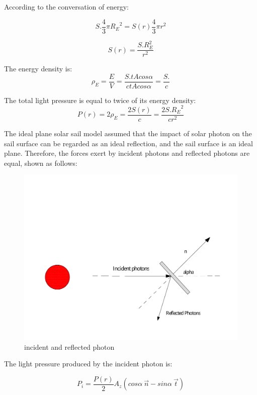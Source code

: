 \documentclass[../Paper.tex]{subfiles}
\begin{document}
According to the conversation of energy:

\[S.\dfrac{4}{3}\pi{R_E}^2=S(r)\dfrac{4}{3}\pi r^2\]

\begin{equation}
S(r)=\dfrac{S.R_E^2}{r^2}
\end{equation}

The energy density is:\\
\begin{equation}
\rho_E=\dfrac{E}{V}=\dfrac{S.tAcos\alpha}{c tAcos\alpha}=\dfrac{S.}{c}
\end{equation}

The total light pressure is equal to twice of its energy density:
\begin{equation}
P(r)=2\rho_E=\dfrac{2S(r)}{c}=\dfrac{2S.{R_E}^2}{cr^2}
\end{equation}

The ideal plane solar sail model assumed that the impact of solar photon on the sail surface can be regarded as an ideal reflection, and the sail surface is an ideal plane. Therefore, the forces exert by incident photons and reflected photons are equal, shown as follows:

\begin{figure}[H]
 \centering
 \includegraphics[scale=0.3]{../Figures/lightpressure.pdf}
 \caption{incident and reflected photon}
\end{figure}

The light pressure produced by the incident photon is:

\begin{equation}
P_i=\frac{P(r)}{2}A_z(cos\alpha~\vec{n}-sin\alpha~\vec{t})
\label{eq:1}
\end{equation}
\end{document}
